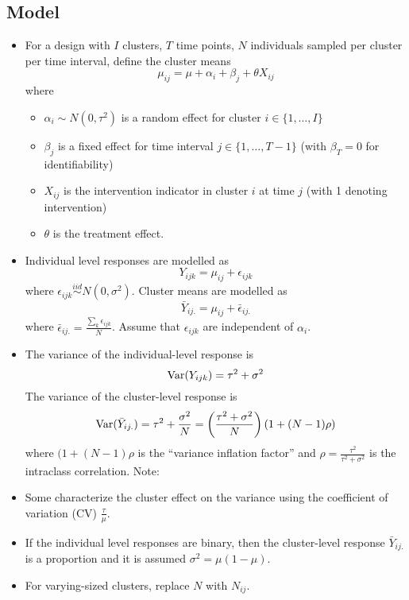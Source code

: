 \documentclass[10pt]{article}
\begin{document}
\subsection{Model}

\begin{itemize}

\item
For a design with $I$ clusters, $T$ time points, $N$ individuals sampled per cluster per time interval, define the cluster means
\[
\mu_{ij} = \mu + \alpha_i + \beta_j + \theta X_{ij}
\]
where
\begin{itemize}
\item
$\alpha_i\sim N(0,\tau^2)$ is a random effect for cluster $i\in \{1,\ldots,I\}$
\item
$\beta_j$ is a fixed effect for time interval $j\in \{1,\ldots,T-1\}$ (with $\beta_T=0$ for identifiability)
\item
$X_{ij}$ is the intervention indicator in cluster $i$ at time $j$ (with 1 denoting intervention)
\item
$\theta$ is the treatment effect.
\end{itemize}

\item
Individual level responses are modelled as
\[
Y_{ijk} = \mu_{ij} + \epsilon_{ijk}
\]
where $\epsilon_{ijk}\overset{iid}{\sim} N(0,\sigma^2)$. Cluster means are modelled as
\[
\bar{Y}_{ij.} = \mu_{ij} + \bar{\epsilon}_{ij.}
\]
where $\bar{\epsilon}_{ij.} = \frac{\sum_k\epsilon_{ijk}}{N}$. Assume that $\epsilon_{ijk}$ are independent of $\alpha_i$.

\item
The variance of the individual-level response is
\[
\mathrm{Var}(Y_{ijk}) = \tau^2 + \sigma^2
\]
The variance of the cluster-level response is
\[
\mathrm{Var}(\bar{Y}_{ij.}) = \tau^2 + \frac{\sigma^2}{N} = \left(\frac{\tau^2+\sigma^2}{N}\right)(1+(N-1)\rho)
\]
where $(1+(N-1)\rho$ is the ``variance inflation factor'' and $\rho=\frac{\tau^2}{\tau^2+\sigma^2}$ is the intraclass correlation. Note:

\item
Some characterize the cluster effect on the variance using the coefficient of variation (CV) $\frac{\tau}{\mu}$.

\item
If the individual level responses are binary, then the cluster-level response $\bar{Y}_{ij.}$ is a proportion and it is assumed $\sigma^2=\mu(1-\mu)$.

\item
For varying-sized clusters, replace $N$ with $N_{ij}$.

\end{itemize}
\end{document}
